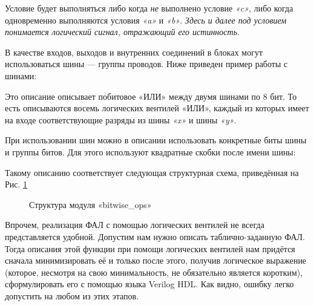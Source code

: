 \documentclass[a5paper, DIV=14, headings=openany, twoside=true,fontsize=10pt, titlepage]{scrreprt}
\newcommand{\quotes}[1]{«#1»}
\newcommand{\eng}[1]{\foreignlanguage{english}{#1}}
\newcommand{\qeng}[1]{\quotes{\eng{#1}}}
\begin{document}
\par{Условие будет выполняться либо когда \emph{не} выполнено условие \emph{\qeng{c}}, либо когда одновременно выполняются условия \emph{\qeng{a}} и \emph{\qeng{b}}. \emph{Здесь и далее под условием понимается логический сигнал, отражающий его истинность.}}
\par{В качестве входов, выходов и внутренних соединений в блоках могут использоваться шины — группы проводов. Ниже приведен пример работы с шинами:}



\par{Это описание описывает побитовое \quotes{ИЛИ} между двумя шинами по 8 бит. То есть описываются восемь логических вентилей \quotes{ИЛИ}, каждый из которых имеет на входе соответствующие разряды из шины \emph{\qeng{x}} и шины \emph{\qeng{y}}.}

\par{При использовании шин можно в описании использовать конкретные биты шины и группы битов. Для этого используют квадратные скобки после имени шины:}



\par{Такому описанию соответствует следующая структурная схема, приведённая на Рис. \ref{fig:bitwiseops}}

\begin{figure}[H]
\centering
\def\svgwidth{\columnwidth}

\caption{Структура модуля \qeng{bitwise\_ops}}
\label{fig:bitwiseops}
\end{figure}

\par{Впрочем, реализация ФАЛ с помощью логических вентилей не всегда представляется удобной. Допустим нам нужно описать таблично-заданную ФАЛ. Тогда описания этой функции при помощи логических вентилей нам придётся сначала минимизировать её и только после этого, получив логическое выражение (которое, несмотря на свою минимальность, не обязательно является коротким), сформулировать его с помощью языка \eng{Verilog HDL}. Как видно, ошибку легко допустить на любом из этих этапов.}
 
\end{document}
